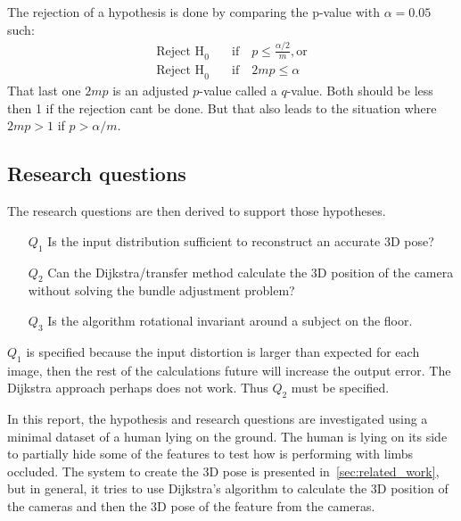 The rejection of a hypothesis is done by comparing the p-value with $\alpha=0.05$ such:
\begin{align*}
    \text{Reject H}_0 & \quad\text{if}\quad p \leq \frac{\alpha /2}{m}, \text{or}\\
    \text{Reject H}_0 & \quad\text{if}\quad 2mp \leq \alpha
\end{align*}
That last one $2mp$ is an adjusted $p$-value called a $q$-value.
Both should be less then 1 if the rejection cant be done.
But that also leads to the situation where $2mp > 1$ if $p>\alpha/m$.

\subsection{Research questions}%
\label{sub:method:research_questions}
The research questions are then derived to support those hypotheses.
\begin{itemize}
    \item[$Q_1$] Is the input distribution sufficient to reconstruct an accurate 3D pose?
    \item[$Q_2$] Can the Dijkstra/transfer method calculate the 3D position of the camera without solving the bundle adjustment problem?
    \item[$Q_3$] Is the \openpose algorithm rotational invariant around a subject on the floor.
\end{itemize}
$Q_1$ is specified because the input distortion is larger than expected for each image, then the rest of the calculations future will increase the output error.
The Dijkstra approach perhaps does not work. Thus $Q_2$ must be specified.


In this report, the hypothesis and research questions are investigated using a minimal dataset of a human lying on the ground.
The human is lying on its side to partially hide some of the features to test how \openpose is performing with limbs occluded.
The system to create the 3D pose is presented in~\ref{sec:related_work}, but in general, it tries to use Dijkstra's algorithm to calculate the 3D position of the cameras and then the 3D pose of the feature from the cameras.





